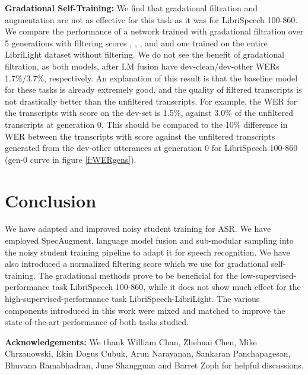\documentclass[a4paper]{article}
\begin{document}
\noindent\textbf{Gradational Self-Training:} We find that gradational filtration and augmentation are not as effective for this task as it was for LibriSpeech 100-860. We compare the performance of a network trained with gradational filtration over 5 generations with filtering scores , , ,  and  and one trained on the entire LibriLight dataset without filtering. We do not see the benefit of gradational filtration, as both models, after LM fusion have dev-clean/dev-other WERs 1.7\%/3.7\%, respectively. An explanation of this result is that the baseline model for these tasks is already extremely good, and the quality of filtered transcripts is not drastically better than the unfiltered transcripts. For example, the WER for the transcripts with score  on the dev-set is 1.5\%, against 3.0\% of the unfiltered transcripts at generation 0. This should be compared to the  10\% difference in WER between the transcripts with score  against the unfiltered transcripts generated from the dev-other utterances at generation 0 for LibriSpeech 100-860 (gen-0 curve in figure \ref{f:WERgens}).

\section{Conclusion}

We have adapted and improved noisy student training for ASR. We have employed SpecAugment, language model fusion and sub-modular sampling into the noisy student training pipeline to adapt it for speech recognition. We have also introduced a normalized filtering score which we use for gradational self-training. The gradational methods prove to be beneficial for the low-supervised-performance task LibriSpeech 100-860, while it does not show much effect for the high-supervised-performance task LibriSpeech-LibriLight. The various components introduced in this work were mixed and matched to improve the state-of-the-art performance of both tasks studied.
\smallskip

\noindent\textbf{Acknowledgements:} We thank William Chan, Zhehuai Chen, Mike Chrzanowski, Ekin Dogus Cubuk, Arun Narayanan, Sankaran Panchapagesan, Bhuvana Ramabhadran, June Shangguan and Barret Zoph for helpful discussions.




\end{document}
